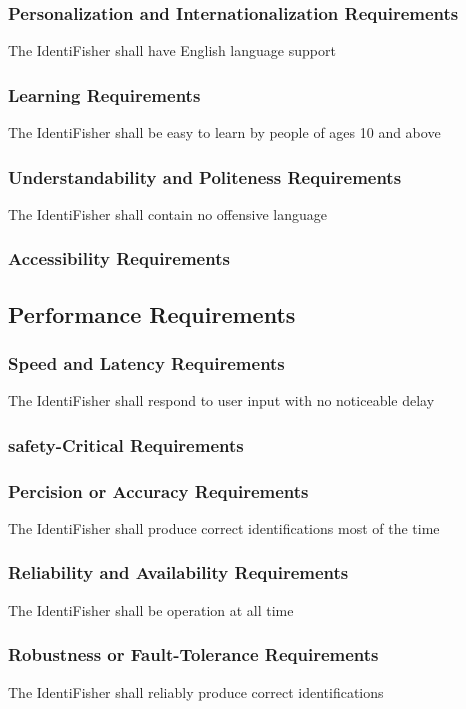 \documentclass{article}
\begin{document}
\subsubsection{Personalization and Internationalization Requirements}
The IdentiFisher shall have English language support
\subsubsection{Learning Requirements}
The IdentiFisher shall be easy to learn by people of ages 10 and above
\subsubsection{Understandability and Politeness Requirements}
The IdentiFisher shall contain no offensive language
\subsubsection{Accessibility Requirements}

\subsection{Performance Requirements}
\subsubsection{Speed and Latency Requirements}
The IdentiFisher shall respond to user input with no noticeable delay
\subsubsection{safety-Critical Requirements}

\subsubsection{Percision or Accuracy Requirements}
The IdentiFisher shall produce correct identifications most of the time
\subsubsection{Reliability and Availability Requirements}
The IdentiFisher shall be operation at all time
\subsubsection{Robustness or Fault-Tolerance Requirements}
The IdentiFisher shall reliably produce correct identifications
\end{document}
